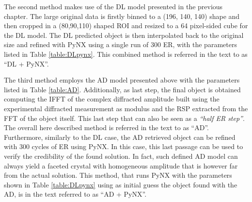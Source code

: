 The second method makes use of the DL model presented in the previous chapter. The large original data is firstly 
binned to a (196, 140, 140) shape and then cropped in a (80,90,110) shaped ROI and resized to a 64 pixel-sided cube 
for the DL model. The DL predicted object is then 
interpolated back to the original size and refined with PyNX using a single run of 300 ER, with the parameters 
listed in Table \ref{table:DLpynx}. This combined method is referred in the text to as ``DL + PyNX''. 
 
The third method employs the AD model presented above with the parameters listed in Table \ref{table:AD}. 
Additionally, as last step, the final object is obtained computing the IFFT of the complex diffracted amplitude built 
using the experimental diffracted measurement as modulus and the RSP extracted from the FFT of the object itself.
This last step that can also be seen as a \textit{``half ER step''}.\\
The overall here described method is referred in the text to as ``AD''. 
Furthermore, similarly to the DL case, the AD retrieved object can be refined with 300 cycles of ER using PyNX. In this case, 
this last passage can be used to verify the credibility of the found solution. In fact, such defined AD model can always yield 
a faceted crystal with homogeneous amplitude that is however far from the actual solution. This method, that runs PyNX with the 
parameters shown in Table \ref{table:DLpynx} using as initial guess the object found with the AD, is in the text referred to as 
``AD + PyNX''. 

